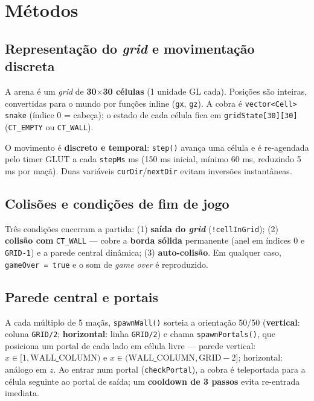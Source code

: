 \documentclass[12pt]{article}
\begin{document}
\section{Métodos}

\subsection{Representação do \textit{grid} e movimentação discreta}

A arena é um \textit{grid} de \textbf{30$\times$30 células} (1 unidade GL cada). Posições são inteiras, convertidas para o mundo por funções inline (\texttt{gx}, \texttt{gz}). A cobra é \texttt{vector<Cell> snake} (índice 0 = cabeça); o estado de cada célula fica em \texttt{gridState[30][30]} (\texttt{CT\_EMPTY} ou \texttt{CT\_WALL}).

O movimento é \textbf{discreto e temporal}: \texttt{step()} avança uma célula e é re-agendada pelo timer GLUT a cada \texttt{stepMs} ms (150 ms inicial, mínimo 60 ms, reduzindo 5 ms por maçã). Duas variáveis \texttt{curDir}/\texttt{nextDir} evitam inversões instantâneas.

\subsection{Colisões e condições de fim de jogo}

Três condições encerram a partida: (1) \textbf{saída do \textit{grid}} (\texttt{!cellInGrid}); (2) \textbf{colisão com} \texttt{CT\_WALL} — cobre a \textbf{borda sólida} permanente (anel em índices 0 e \texttt{GRID-1}) e a parede central dinâmica; (3) \textbf{auto-colisão}. Em qualquer caso, \texttt{gameOver = true} e o som de \textit{game over} é reproduzido.

\subsection{Parede central e portais}

A cada múltiplo de 5 maçãs, \texttt{spawnWall()} sorteia a orientação 50/50 (\textbf{vertical}: coluna \texttt{GRID/2}; \textbf{horizontal}: linha \texttt{GRID/2}) e chama \texttt{spawnPortals()}, que posiciona um portal de cada lado em célula livre — parede vertical: $x \in [1,\text{WALL\_COLUMN})$ e $x \in (\text{WALL\_COLUMN}, \text{GRID}-2]$; horizontal: análogo em $z$. Ao entrar num portal (\texttt{checkPortal}), a cobra é teleportada para a célula seguinte ao portal de saída; um \textbf{cooldown de 3 passos} evita re-entrada imediata.
\end{document}
